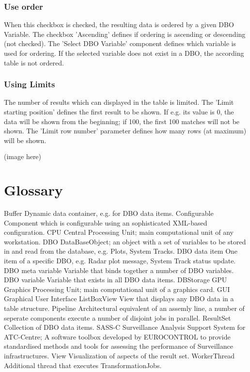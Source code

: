 \documentclass[10pt,letterpaper,extrafontsizes]{memoir}
\begin{document}
\subsubsection{Use order}
When this checkbox is checked, the resulting data is ordered by a given DBO Variable.  The checkbox
'Ascending' defines if ordering is ascending or descending (not checked).   The 'Select DBO Variable'
component defines which variable is used for ordering.  If the selected variable does not exist in a DBO,
the according table is not ordered.

\subsubsection{Using Limits}
The number of results which can displayed in the table is limited. The 'Limit starting position' defines the
first result to be shown. If e.g. its value is 0, the data will be shown from the beginning; if 100, the first 100
matches will not be shown.
The 'Limit row number' parameter defines how many rows (at maximum) will be shown.

(image here)

\section{Glossary}
Buffer
Dynamic data container, e.g. for DBO data items.
Configurable
Component which is configurable using an sophisticated XML-based configuration.
CPU
Central Processing Unit; main computational unit of any workstation.
DBO
DataBaseObject; an object with a set of variables to be stored in and read from the database, e.g. Plots, System Tracks.
DBO data item
One item of a specific DBO, e.g. Radar plot message, System Track status update.
DBO meta variable
Variable that binds together a number of DBO variables. 
DBO variable
Variable that exists in all DBO data items.
DBStorage
GPU
Graphics Processing Unit; main computational unit of a graphics card.
GUI
Graphical User Interface
ListBoxView
View that displays any DBO data in a table structure.
Pipeline
Architectural equivalent of an assemly line, a number of seperate components execute a number of disjoint jobs in parallel.
ResultSet
Collection of DBO data items.
SASS-C
Surveillance Analysis Support System for ATC-Centre; A software toolbox developed by EUROCONTROL to provide standardised methods and tools for assessing the performance of Surveillance
infrastructures.
View
Visualization of aspects of the result set.
WorkerThread
Additional thread that executes TransformationJobs.
\end{document}
